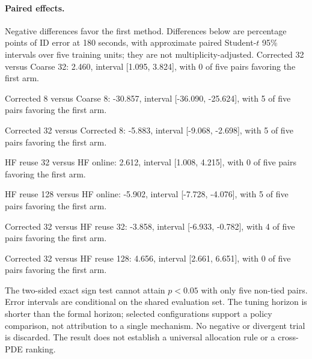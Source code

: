 \paragraph{Paired effects.} Negative differences favor the first method. Differences below are percentage points of ID error at 180 seconds, with approximate paired Student-$t$ 95\% intervals over five training units; they are not multiplicity-adjusted.
Corrected 32 versus Coarse 32: 2.460, interval [1.095, 3.824], with 0 of five pairs favoring the first arm.\par
Corrected 8 versus Coarse 8: -30.857, interval [-36.090, -25.624], with 5 of five pairs favoring the first arm.\par
Corrected 32 versus Corrected 8: -5.883, interval [-9.068, -2.698], with 5 of five pairs favoring the first arm.\par
HF reuse 32 versus HF online: 2.612, interval [1.008, 4.215], with 0 of five pairs favoring the first arm.\par
HF reuse 128 versus HF online: -5.902, interval [-7.728, -4.076], with 5 of five pairs favoring the first arm.\par
Corrected 32 versus HF reuse 32: -3.858, interval [-6.933, -0.782], with 4 of five pairs favoring the first arm.\par
Corrected 32 versus HF reuse 128: 4.656, interval [2.661, 6.651], with 0 of five pairs favoring the first arm.\par
The two-sided exact sign test cannot attain $p<0.05$ with only five non-tied pairs. Error intervals are conditional on the shared evaluation set. The tuning horizon is shorter than the formal horizon; selected configurations support a policy comparison, not attribution to a single mechanism. No negative or divergent trial is discarded. The result does not establish a universal allocation rule or a cross-PDE ranking.